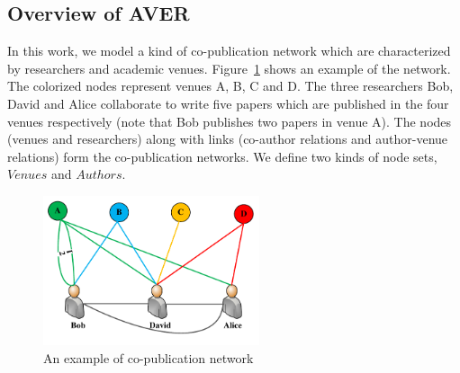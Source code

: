 \documentclass{sig-alternate-2013}
\begin{document}
\subsection{Overview of AVER}
In this work, we model a kind of co-publication network which are characterized by researchers and academic venues. Figure~\ref{Fig2} shows an example of the network. The colorized nodes represent venues A, B, C and D. The three researchers Bob, David and Alice collaborate to write five papers which are published in the four venues respectively (note that Bob publishes two papers in venue A). The nodes (venues and researchers) along with links (co-author relations and author-venue relations) form the co-publication networks. We define two kinds of node sets, $Venues$ and $Authors$.
\begin{figure}[t]
\centering
\includegraphics [width=2.5in]{Fig2.pdf}
\caption{An example of co-publication network}
\label{Fig2}
\end{figure}
\end{document}
